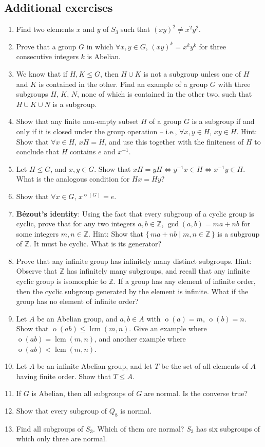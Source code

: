 \documentclass[svgnames]{article}
\theoremstyle{definition}
\theoremstyle{remark}
\DeclareMathOperator{\ord}{o}
\DeclareMathOperator{\lcm}{lcm}
\begin{document}
\begin{appendices}
\section{Additional exercises}\label{sec:Exercises}
\begin{enumerate}
\item Find two elements $x$ and $y$ of $S_3$ such that $(xy)^2 \ne x^2 y^2$.
\item Prove that a group $G$ in which $\forall x,y \in G$, $(xy)^k = x^k y^k$ for three consecutive integers $k$ is Abelian.
\item We know that if $H, K \le G$, then $H \cup K$ is not a subgroup unless one of $H$ and $K$ is contained in the other. Find an example of a group $G$ with three subgroups $H$, $K$, $N$, none of which is contained in the other two, such that $H \cup K \cup N$ is a subgroup.
\item Show that any finite non-empty subset $H$ of a group $G$ is a subgroup if and only if it is closed under the group operation -- i.e., $\forall x, y \in H$, $xy \in H$. {\tiny Hint: Show that $\forall x \in H$, $xH = H$, and use this together with the finiteness of $H$ to conclude that $H$ contains $e$ and $x^{-1}$.}
\item Let $H \le G$, and $x, y \in G$. Show that $xH = yH \iff y^{-1}x \in H \iff x^{-1}y \in H$. What is the analogous condition for $Hx = Hy$?
\item Show that $\forall x \in G$, $x^{\ord(G)} = e$.
\item \textbf{B\'ezout's identity}: Using the fact that every subgroup of a cyclic group is cyclic, prove that for any two integers $a, b \in \mathbb Z$, $\gcd(a,b) = ma + nb$ for some integers $m, n \in \mathbb Z$. {\tiny Hint: Show that $\{\, ma + nb \mid m, n \in \mathbb Z \,\}$ is a subgroup of $\mathbb Z$. It must be cyclic. What is its generator?}
\item Prove that any infinite group has infinitely many distinct subgroups. {\tiny Hint: Observe that $\mathbb Z$ has infinitely many subgroups, and recall that any infinite cyclic group is isomorphic to $\mathbb Z$. If a group has any element of infinite order, then the cyclic subgroup generated by the element is infinite. What if the group has no element of infinite order?}
\item Let $A$ be an Abelian group, and $a, b \in A$ with $\ord(a) = m$, $\ord(b) = n$. Show that $\ord(ab) \le \lcm(m, n)$. Give an example where $\ord(ab) = \lcm(m,n)$, and another example where $\ord(ab) < \lcm(m,n)$.
\item Let $A$ be an infinite Abelian group, and let $T$ be the set of all elements of $A$ having finite order. Show that $T \le A$.
\item If $G$ is Abelian, then all subgroups of $G$ are normal. Is the converse true?
\item Show that every subgroup of $Q_8$ is normal.
\item Find all subgroups of $S_3$. Which of them are normal? {\tiny $S_3$ has six subgroups of which only three are normal.}
\end{enumerate}
\end{appendices}
\end{document}
